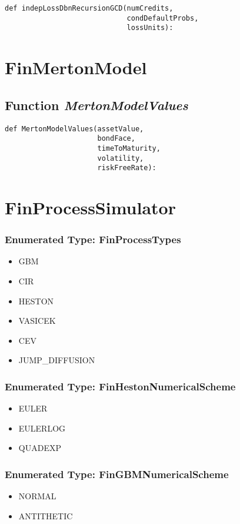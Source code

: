\documentclass[twoside,11pt]{book}
\begin{document}
\begin{lstlisting}
def indepLossDbnRecursionGCD(numCredits, 
                             condDefaultProbs,
                             lossUnits):
\end{lstlisting}

\newpage
\section{FinMertonModel}

\subsection{Function {\it MertonModelValues}}


\begin{lstlisting}
def MertonModelValues(assetValue, 
                      bondFace, 
                      timeToMaturity, 
                      volatility, 
                      riskFreeRate):
\end{lstlisting}

\newpage
\section{FinProcessSimulator}

\subsubsection{Enumerated Type: FinProcessTypes}
\begin{itemize}
\item{GBM}
\item{CIR}
\item{HESTON}
\item{VASICEK}
\item{CEV}
\item{JUMP\_DIFFUSION}
\end{itemize}

\subsubsection{Enumerated Type: FinHestonNumericalScheme}
\begin{itemize}
\item{EULER}
\item{EULERLOG}
\item{QUADEXP}
\end{itemize}

\subsubsection{Enumerated Type: FinGBMNumericalScheme}
\begin{itemize}
\item{NORMAL}
\item{ANTITHETIC}
\end{itemize}
\end{document}
